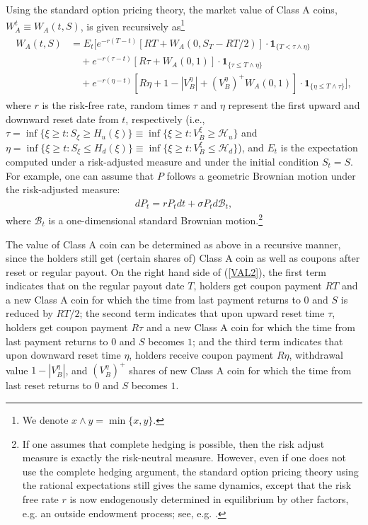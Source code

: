 \documentclass[draft, noinfoline]{ectaart}
\numberwithin{equation}{section}
\theoremstyle{plain}
\begin{document}
Using the standard option pricing theory, the market value of Class A coins, $W^t_{A}\equiv W_A(t,S)$, is given recursively as\footnote{We denote $x\land y=\min\{x,y\}$.}
\begin{align}
\begin{split}W_{A}(t,S) & =E_{t}\Bigg[e^{-r(T-t)}[RT+W_A(0,S_T-RT/2)]\cdot\mathbf{1}_{\{T<\tau\land\eta\}}\\
&\quad+e^{-r(\tau-t)}[R\tau+W_{A}(0,1)]\cdot\mathbf{1}_{\{\tau\le T\land\eta\}}\\
 & \quad+e^{-r(\eta-t)}[R\eta+1-|V_{B}^{\eta}|+(V_{B}^{\eta})^+W_{A}(0,1)]\cdot\mathbf{1}_{\{\eta\le T\land\tau\}}\Bigg],
\end{split}
\label{VAL2}
\end{align}
where $r$ is the risk-free rate, random times $\tau$ and $\eta$ represent the first upward and downward reset date from $t$, respectively (i.e., $\tau=\inf \{\xi \ge t:S_{\xi}\ge H_u(\xi)\}\equiv \inf \{\xi \ge t:V^{\xi}_B\ge \mathcal{H}_u\}$ and $\eta=\inf \{\xi\ge t:S_{\xi}\le H_d(\xi)\}\equiv \inf \{\xi \ge t:V^{\xi}_B\leq \mathcal{H}_d\}$), and $E_{t}$ is the expectation computed under a risk-adjusted measure and under the initial condition $S_{t}=S$. For example, one can assume that $P$ follows a geometric Brownian motion under the  risk-adjusted measure:
\begin{align}\label{eqn:GBM}
dP_{t}=r P_tdt+\sigma P_{t}d\mathcal{B}_{t},
\end{align}
where $\mathcal{B}_{t}$ is a one-dimensional standard Brownian motion.\footnote{If one assumes that complete hedging is possible, then the risk adjust measure is exactly the risk-neutral measure. However, even if one does not use the complete hedging argument, the standard option pricing theory using the rational expectations still gives the same dynamics, except that the risk free rate $r$ is now endogenously determined in equilibrium by other factors, e.g. an outside endowment process; see, e.g. \cite{kou2002}.}

The value of Class A coin can be determined as above in a recursive manner, since the holders still get (certain shares of) Class A coin as well as coupons after reset or regular payout. On the right hand side of (\ref{VAL2}), the first term indicates that on the regular payout date $T$, holders get coupon payment $RT$ and a new Class A coin for which the time from last payment returns to 0 and $S$ is reduced by $RT/2$; the second term indicates that upon upward reset time $\tau$, holders get coupon payment $R\tau$ and a new Class A coin for which the time from last payment returns to 0 and $S$ becomes $1$; and the third term indicates that upon downward reset time $\eta$, holders receive coupon payment $R\eta$, withdrawal value $1-|V_{B}^{\eta}|$, and  $(V_{B}^{\eta})^+$ shares of new Class A coin for which the time from last reset returns to 0 and $S$ becomes $1$.
\end{document}

